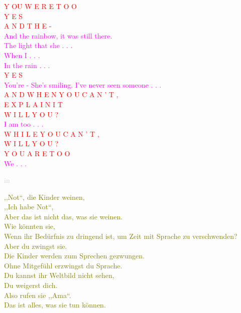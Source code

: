 \documentclass[11pt]{article}
\begin{document}
\begingroup
\begin{center}
\textcolor{red}{Y OU \hspace{10mm} W E R E  \hspace{10mm} T O O \\ Y E S \\ A N D \hspace{10mm} T H E - } \\ \textcolor{magenta}{And the rainbow, it was still there. \\ The light that she . . . \\ When I . . . \\ In the rain . . . } \\\textcolor{red}{Y E S} \\ \textcolor{magenta}{ You're - She's smiling. I've never seen someone . . . } \\ \textcolor{red}{ A N D \hspace{10mm} W H E N \hspace{10mm} Y O U \hspace{10mm} C A N ' T , \\ E X P L A I N \hspace{10mm} I T \\ W I L L \hspace{10mm} Y O U ? \\ } \textcolor{magenta}{ I am too . . . } \\ \textcolor{red}{ W H I L E \hspace{10mm} Y O U \hspace{10mm} C A N ' T , \\ W I L L \hspace{10mm} Y O U ? \\ Y O U \hspace{10mm} A R E \hspace{10mm} T O O} \\ \textcolor{magenta}{We . . .}
\end{center}
\endgroup

\begingroup
\begin{center}
\textcolor{lightgray}{in}
\rightskip\leftskip
\end{center}
\endgroup

\begingroup
\begin{center}
\textcolor{olive}{,,Not“, die Kinder weinen, \\ ,,Ich habe Not“, \\ Aber das ist nicht das, was sie weinen. \\ Wie könnten sie, \\ Wenn ihr Bedürfnis zu dringend ist, um Zeit mit Sprache zu verschwenden? \\ Aber du zwingst sie. \\ Die Kinder werden zum Sprechen gezwungen. \\ Ohne Mitgefühl erzwingst du Sprache. \\ Du kannst ihr Weltbild nicht sehen, \\ Du weigerst dich. \\ Also rufen sie ,,Ama“. \\ Das ist alles, was sie tun können. }
\end{center}
\endgroup
\end{document}
